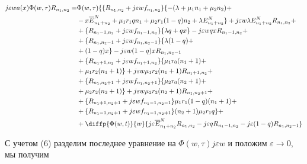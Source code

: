  \begin{equation}
	\begin{split}
		j\varepsilon wa(x) \Phi (w,\tau)R_{n_{1}, n_{2}}=
		&\Phi (w,\tau)\{\{R_{n_{1}, n_{2}}+j\varepsilon w f_{n_{1}, n_{2}}\}\{-(\lambda+\mu_{1}n_{1}+\mu_{2}n_{2}) +\\
		&-x\overline{E}_{n_{1}+n_{2}}^N+\mu_{1}r_{1}q n_{1}+ \mu_{2}r_{1}(1-q)n_{2}+ \lambda E_{n_{1}+n_{2}}^N\} +j\varepsilon w \lambda E_{n_{1}+n_{2}}^NR_{n_{1}, n_{2}} +\\
		&+\{R_{n_{1}-1, n_{2}}+j\varepsilon w f_{n_{1}-1, n_{2}}\}\{\lambda q+ q  x\}-j\varepsilon wq xR_{n_{1}-1, n_{2}}+\\
		&+\{R_{n_{1}, n_{2}-1}+j\varepsilon w f_{n_{1}, n_{2}-1}\}\{\lambda (1-q) +\\
		&+ (1-q) x\} -j\varepsilon w(1-q) xR_{n_{1}, n_{2}-1} \\
		&+ \{R_{n_{1}+1, n_{2}}+j\varepsilon w f_{n_{1}+1, n_{2}}\}\{\mu_{1} r_{0}(n_{1}+1)+\\
		& + \mu_{1} r_{2}(n_{1}+1)\}+j\varepsilon w\mu_{1} r_{2}(n_{1}+1)R_{n_{1}+1, n_{2}}+\\
		&+ \{R_{n_{1}, n_{2}+1}+j\varepsilon w f_{n_{1}, n_{2}+1}\}\{\mu_{2} r_{0}(n_{2}+1)+\\
		& + \mu_{2} r_{2} (n_{2}+1)\} +j\varepsilon w\mu_{2} r_{2} (n_{2}+1)R_{n_{1}, n_{2}+1}+\\
		&+\{R_{n_{1}+1, n_{2}+1}+j\varepsilon w f_{n_{1}-1, n_{2}-1}\}\mu_{1} r_{1}(1-q)(n_{1}+1) +\\
		&+\{R_{n_{1}-1, n_{2}+1}+j\varepsilon w f_{n_{1}-1, n_{2}+1}\}(n_{2}+1)\mu_{2} r_{1}q\}  +\\
		&+ \diffp{\Phi(w,t)}{w}\{j\varepsilon \overline{E}_{n_{1}+n_{2}}^NR_{n_{1}, n_{2}}-  j\varepsilon q R_{n_{1}-1, n_{2}}-j \varepsilon (1-q) R_{n_{1}, n_{2}-1}\}
	\end{split}
\end{equation}

С учетом (6) разделим последнее уравнение на $\Phi (w, \tau)j\varepsilon w$ и положим $\varepsilon \rightarrow 0$, мы получим

